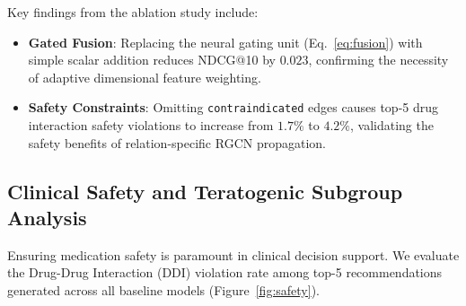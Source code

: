 \documentclass[11pt,a4paper]{article}
\begin{document}
\begin{table}[t]
\centering
\caption{\textbf{Architectural Component Ablation Study.} Evaluating the impact of edge types, textual context, gated fusion, and loss formulation.}
\label{tab:ablation}
\small
{}
\end{table}

Key findings from the ablation study include:
\begin{itemize}[leftmargin=*]
    \item \textbf{Gated Fusion}: Replacing the neural gating unit (Eq.~\ref{eq:fusion}) with simple scalar addition reduces NDCG@10 by $0.023$, confirming the necessity of adaptive dimensional feature weighting.
    \item \textbf{Safety Constraints}: Omitting \texttt{contraindicated} edges causes top-5 drug interaction safety violations to increase from $1.7\%$ to $4.2\%$, validating the safety benefits of relation-specific RGCN propagation.
\end{itemize}

\subsection{Clinical Safety and Teratogenic Subgroup Analysis}

Ensuring medication safety is paramount in clinical decision support. We evaluate the Drug-Drug Interaction (DDI) violation rate among top-5 recommendations generated across all baseline models (Figure~\ref{fig:safety}).
\end{document}
